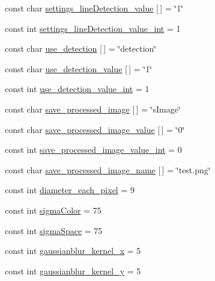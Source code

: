 \begin{DoxyCompactItemize}
\item 
const char \mbox{\hyperlink{namespaceyenot_a300cc5d9afdbc58876cf3b52a2d9f055}{settings\+\_\+line\+Detection\+\_\+value}} \mbox{[}$\,$\mbox{]} = \char`\"{}1\char`\"{}
\item 
const int \mbox{\hyperlink{namespaceyenot_ae8c5d5792720627ea225afb6ee387915}{settings\+\_\+line\+Detection\+\_\+value\+\_\+int}} = 1
\item 
const char \mbox{\hyperlink{namespaceyenot_a17fec4b53b47f434f720ad8e804e3497}{use\+\_\+detection}} \mbox{[}$\,$\mbox{]} = \char`\"{}detection\char`\"{}
\item 
const char \mbox{\hyperlink{namespaceyenot_affbdf7e1315bdd3e0c9f7bb5d1b0a9b1}{use\+\_\+detection\+\_\+value}} \mbox{[}$\,$\mbox{]} = \char`\"{}1\char`\"{}
\item 
const int \mbox{\hyperlink{namespaceyenot_a8ba9c1f83b4502a37417a016875a3918}{use\+\_\+detection\+\_\+value\+\_\+int}} = 1
\item 
const char \mbox{\hyperlink{namespaceyenot_ab35e22cfa0a4ef6c8e960cfa75873aa0}{save\+\_\+processed\+\_\+image}} \mbox{[}$\,$\mbox{]} = \char`\"{}s\+Image\char`\"{}
\item 
const char \mbox{\hyperlink{namespaceyenot_ace3fd31c709279dc1bb3450404d770b0}{save\+\_\+processed\+\_\+image\+\_\+value}} \mbox{[}$\,$\mbox{]} = \char`\"{}0\char`\"{}
\item 
const int \mbox{\hyperlink{namespaceyenot_accc48c2808f0c8c98f853614c546b5eb}{save\+\_\+processed\+\_\+image\+\_\+value\+\_\+int}} = 0
\item 
const char \mbox{\hyperlink{namespaceyenot_afe93bb98a5b2fd1f0cab330e4da59332}{save\+\_\+processed\+\_\+image\+\_\+name}} \mbox{[}$\,$\mbox{]} = \char`\"{}test.\+png\char`\"{}
\item 
const int \mbox{\hyperlink{namespaceyenot_a6c5730ae743bc1203438dfcf6f35faeb}{diameter\+\_\+each\+\_\+pixel}} = 9
\item 
const int \mbox{\hyperlink{namespaceyenot_a54032afcd8390f4a4975bbf20ffa248c}{sigma\+Color}} = 75
\item 
const int \mbox{\hyperlink{namespaceyenot_adbbb6d50f7db1942c60be8b5d621d3b7}{sigma\+Space}} = 75
\item 
const int \mbox{\hyperlink{namespaceyenot_a7b716ae635492024820f16eb8c04a385}{gaussianblur\+\_\+kernel\+\_\+x}} = 5
\item 
const int \mbox{\hyperlink{namespaceyenot_a9f129e682fdc00d2869d4ed69a4c6aa7}{gaussianblur\+\_\+kernel\+\_\+y}} = 5
\item 

\end{DoxyCompactItemize}
